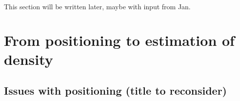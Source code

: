 \documentclass[10pt,a4paper]{article}
\begin{document}
This section will be written later, maybe with input from Jan.

\section{From positioning to estimation of density}
\label{sec:density}


\subsection{Issues with positioning (title to reconsider)}
\end{document}
